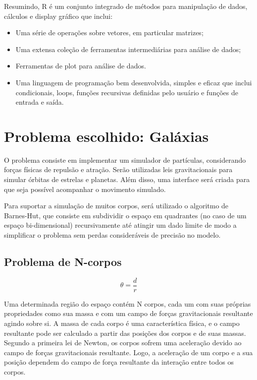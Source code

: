 \documentclass[rel_mlp]{iiufrgs}
\begin{document}
	Resumindo, R é um conjunto integrado de métodos para manipulação de dados, cálculos e display gráfico que inclui:
\begin{itemize}
\item Uma série de operações sobre vetores, em particular matrizes;
\item Uma extensa coleção de ferramentas intermediárias para análise de dados;
\item Ferramentas de plot para análise de dados.
\item Uma linguagem de programação bem desenvolvida, simples e eficaz que inclui condicionais, loops, funções recursivas definidas pelo usuário e funções de entrada e saída.
\end{itemize}

\section{Problema escolhido: Galáxias}

	O problema consiste em implementar um simulador de partículas, considerando forças físicas de repulsão e atração. Serão utilizadas leis gravitacionais para simular órbitas de estrelas e planetas. Além disso, uma interface será criada para que seja possível acompanhar o movimento simulado.

    Para suportar a simulação de muitos corpos, será utilizado o algoritmo de Barnes-Hut, que consiste em subdividir o espaço em quadrantes (no caso de um espaço bi-dimensional) recursivamente até atingir um dado limite de modo a simplificar o problema sem perdas consideráveis de precisão no modelo.

\subsection{Problema de N-corpos}

\begin{equation}
\label{theta}
\theta=\frac{d}{r}
\end{equation}

Uma determinada região do espaço contém N corpos, cada um com suas próprias propriedades como sua massa e com um campo de forças gravitacionais resultante agindo sobre si. A massa de cada corpo é uma característica física, e o campo resultante pode ser calculado a partir das posições dos corpos e de suas massas. Segundo a primeira lei de Newton, os corpos sofrem uma aceleração devido ao campo de forças gravitacionais resultante. Logo, a aceleração de um corpo e a sua posição dependem do campo de força resultante da interação entre todos os corpos.
\end{document}
